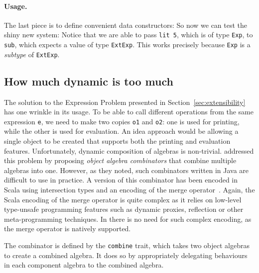 \paragraph{Usage.} The last piece is to define convenient data constructors:
So now we can test the shiny new system:
Notice that we are able to pass \lstinline{lit 5}, which is of type
\lstinline{Exp}, to \lstinline{sub}, which expects a value of type
\lstinline{ExtExp}. This works precisely because \lstinline{Exp} is a
\textit{subtype} of \lstinline{ExtExp}.



\subsection{How much dynamic is too much}



The solution to the Expression Problem presented in
Section~\ref{sec:extensibility} has one wrinkle in its usage. To be able to call
different operations from the same expression \lstinline{e}, we need to make two
copies \lstinline{o1} and \lstinline{o2}: one is used for printing, while the
other is used for evaluation. An idea approach would be allowing a single object
to be created that supports both the printing and evaluation features.
Unfortunately, dynamic composition of algebras is non-trivial.
\citet{oliveira2012extensibility} addressed this problem by proposing
\textit{object algebra combinators} that combine multiple algebras into one.
However, as they noted, such combinators written in Java are difficult to use in
practice. A version of this combinator has been encoded in Scala using
intersection types and an encoding of the merge
operator~\cite{oliveira2013feature, rendel14attributes}. Again, the Scala
encoding of the merge operator is quite complex as it relies on low-level
type-unsafe programming features such as dynamic proxies, reflection or other
meta-programming techniques. In \name there is no need for such complex
encoding, as the merge operator is natively supported.

The combinator is defined by the \lstinline{combine} trait, which takes two
object algebras to create a combined algebra. It does so by appropriately
delegating behaviours in each component algebra to the combined algebra.

